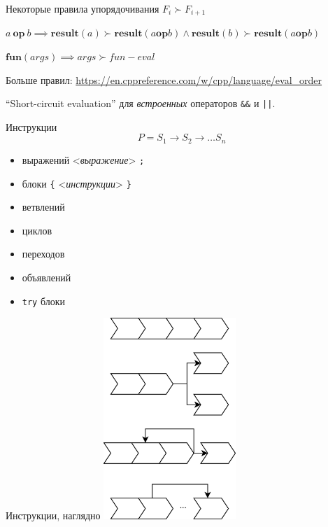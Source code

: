 \documentclass[unknownkeysallowed,xcolor=table]{beamer}
\begin{document}
\begin{frame}{Некоторые правила упорядочивания}
    $F_i \succ F_{i+1}$

    \vspace{2em}

    $a \: \mathbf{op} \: b \implies \mathbf{result}(a) \succ \mathbf{result}(a \mathbf{op} b) \land \mathbf{result}(b) \succ \mathbf{result}(a \mathbf{op} b)$

    \vspace{2em}

    $\mathbf{fun}(args) \implies args \succ fun-eval$

    \vspace{2em}

    Больше правил: \url{https://en.cppreference.com/w/cpp/language/eval_order}

    \vspace{2em}

    ``Short-circuit evaluation'' для \emph{встроенных} операторов \lstinline{&&} и \lstinline{||}.
\end{frame}

\begin{frame}[fragile]{Инструкции}
  \[
    P = S_1 \to S_2 \to \dotso S_n
  \]
  \begin{itemize}
    \item выражений <\emph{выражение}> \lstinline{;} \vspace{0.5em}
    \item блоки \lstinline|{| <\emph{инструкции}> \lstinline|}| \vspace{0.5em}
    \item ветвлений \vspace{0.5em}
    \item циклов \vspace{0.5em}
    \item переходов \vspace{0.5em}
    \item объявлений \vspace{0.5em}
    \item \lstinline{try} блоки
  \end{itemize}
\end{frame}

\begin{frame}{Инструкции, наглядно}
  \hspace*{3cm}\includegraphics[align=c,width=5cm,keepaspectratio]{images/control.png}
\end{frame}
\end{document}
